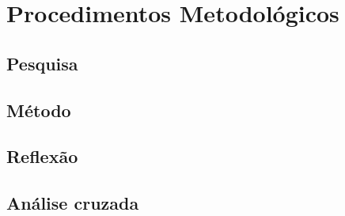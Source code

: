 \chapter{Procedimentos Metodológicos}

\section{Pesquisa}

\section{Método}

\section{Reflexão}

\section{Análise cruzada}
